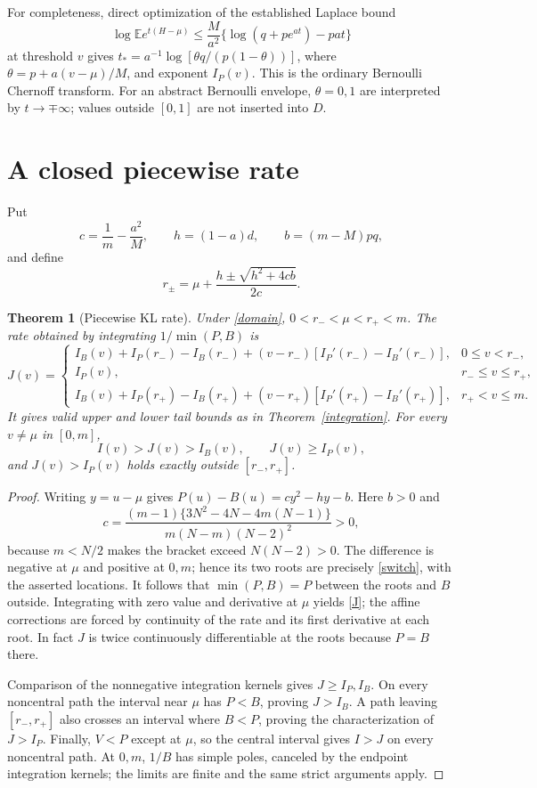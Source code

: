 \documentclass[11pt]{article}
\newtheorem{theorem}{Theorem}
\newcommand{\E}{\mathbb E}
\begin{document}
For completeness, direct optimization of the established Laplace bound
\[
 \log\E e^{t(H-\mu)}\le
 \frac M{a^2}\{\log(q+pe^{at})-pat\}
\]
at threshold $v$ gives
$t_*=a^{-1}\log[\theta q/(p(1-\theta))]$,
where $\theta=p+a(v-\mu)/M$, and exponent $I_P(v)$.
This is the ordinary Bernoulli Chernoff transform. For an abstract
Bernoulli envelope, $\theta=0,1$ are interpreted by $t\to\mp\infty$;
values outside $[0,1]$ are not inserted into $D$.

\section{A closed piecewise rate}
Put
\[
 c=\frac1m-\frac{a^2}{M},\qquad
 h=(1-a)d,\qquad b=(m-M)pq,
\]
and define
\begin{equation}\label{switch}
 r_\pm=\mu+\frac{h\pm\sqrt{h^2+4cb}}{2c}.
\end{equation}
\begin{theorem}[Piecewise KL rate]\label{piecewise}
Under \eqref{domain}, $0<r_-<\mu<r_+<m$. The rate obtained by integrating
$1/\min(P,B)$ is
\begin{equation}\label{J}
 J(v)=
 \begin{cases}
 I_B(v)+I_P(r_-)-I_B(r_-)
 +(v-r_-)[I_P'(r_-)-I_B'(r_-)],&0\le v<r_-,\\
 I_P(v),&r_-\le v\le r_+,\\
 I_B(v)+I_P(r_+)-I_B(r_+)
 +(v-r_+)[I_P'(r_+)-I_B'(r_+)],&r_+<v\le m.
 \end{cases}
\end{equation}
It gives valid upper and lower tail bounds as in Theorem~\ref{integration}.
For every $v\ne\mu$ in $[0,m]$,
\begin{equation}\label{strict}
 I(v)>J(v)>I_B(v),\qquad J(v)\ge I_P(v),
\end{equation}
and $J(v)>I_P(v)$ holds exactly outside $[r_-,r_+]$.
\end{theorem}
\begin{proof}
Writing $y=u-\mu$ gives $P(u)-B(u)=cy^2-hy-b$.
Here $b>0$ and
\[
 c=\frac{(m-1)\{3N^2-4N-4m(N-1)\}}
 {m(N-m)(N-2)^2}>0,
\]
because $m<N/2$ makes the bracket exceed $N(N-2)>0$.
The difference is negative at $\mu$ and positive at $0,m$; hence its
two roots are precisely \eqref{switch}, with the asserted locations.
It follows that $\min(P,B)=P$ between the roots and $B$ outside.
Integrating with zero value and derivative at $\mu$ yields \eqref{J};
the affine corrections are forced by continuity of the rate and its
first derivative at each root. In fact $J$ is twice continuously
differentiable at the roots because $P=B$ there.

Comparison of the nonnegative integration kernels gives $J\ge I_P,I_B$.
On every noncentral path the interval near $\mu$ has $P<B$, proving
$J>I_B$. A path leaving $[r_-,r_+]$ also crosses an interval where $B<P$,
proving the characterization of $J>I_P$. Finally, $V<P$ except at $\mu$,
so the central interval gives $I>J$ on every noncentral path.
At $0,m$, $1/B$ has simple poles, canceled by the endpoint integration
kernels; the limits are finite and the same strict arguments apply.
\end{proof}
\end{document}
